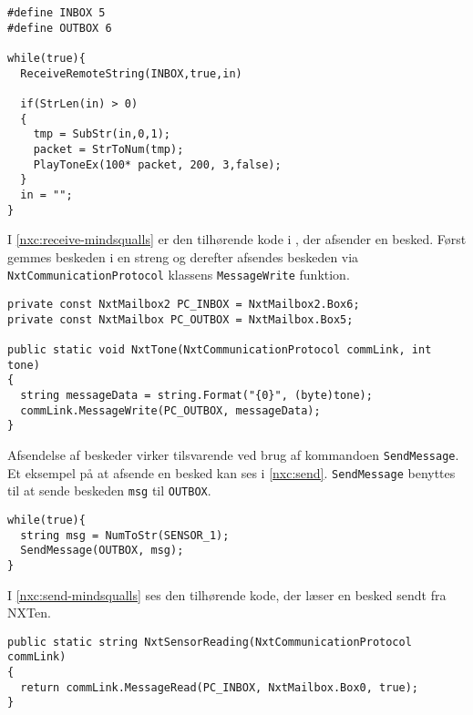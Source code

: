 \begin{lstlisting}[style=c,label=nxc:receive,caption={Et eksempel på at modtage beskeder over Bluetooth.}]
#define INBOX 5
#define OUTBOX 6

while(true){
  ReceiveRemoteString(INBOX,true,in)
  
  if(StrLen(in) > 0)
  {
    tmp = SubStr(in,0,1);
    packet = StrToNum(tmp);
    PlayToneEx(100* packet, 200, 3,false);
  }
  in = "";
}
\end{lstlisting}

I \cref{nxc:receive-mindsqualls} er den tilhørende kode i \mindsqualls, der afsender en besked.
Først gemmes beskeden i en streng og derefter afsendes beskeden via \lstinline[style=csharp]!NxtCommunicationProtocol! klassens \lstinline[style=csharp]!MessageWrite! funktion.

\begin{lstlisting}[style=c,breaklines=true, label=nxc:receive-mindsqualls,caption={\mindsqualls kode der afsender en besked.}]
private const NxtMailbox2 PC_INBOX = NxtMailbox2.Box6;
private const NxtMailbox PC_OUTBOX = NxtMailbox.Box5;

public static void NxtTone(NxtCommunicationProtocol commLink, int tone)
{
  string messageData = string.Format("{0}", (byte)tone);
  commLink.MessageWrite(PC_OUTBOX, messageData);
}
\end{lstlisting}

Afsendelse af beskeder virker tilsvarende ved brug af kommandoen \lstinline[style=c]|SendMessage|.
Et eksempel på at afsende en besked kan ses i \cref{nxc:send}.
\lstinline[style=c]|SendMessage| benyttes til at sende beskeden \lstinline[style=c]|msg| til \lstinline[style=c]!OUTBOX!.

\begin{lstlisting}[style=c,label=nxc:send,caption={Eksempel på afsending af besked.}]
while(true){
  string msg = NumToStr(SENSOR_1);
  SendMessage(OUTBOX, msg);
}
\end{lstlisting}

I \cref{nxc:send-mindsqualls} ses den tilhørende \mindsqualls kode, der læser en besked sendt fra NXTen.

\begin{lstlisting}[style=c,breaklines=true,label=nxc:send-mindsqualls,caption={\mindsqualls kode der læser en besked sendt fra NXT'en.}]
public static string NxtSensorReading(NxtCommunicationProtocol commLink)
{
  return commLink.MessageRead(PC_INBOX, NxtMailbox.Box0, true);
}
\end{lstlisting}
